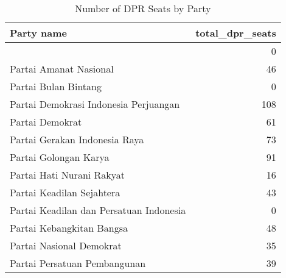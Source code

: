 
\begin{longtable}[t]{lr}
\caption{Number of DPR Seats by Party}\\
\toprule
Party name & total\_dpr\_seats\\
\midrule
 & 0\\
Partai Amanat Nasional & 46\\
Partai Bulan Bintang & 0\\
Partai Demokrasi Indonesia Perjuangan & 108\\
Partai Demokrat & 61\\
\addlinespace
Partai Gerakan Indonesia Raya & 73\\
Partai Golongan Karya & 91\\
Partai Hati Nurani Rakyat & 16\\
Partai Keadilan Sejahtera & 43\\
Partai Keadilan dan Persatuan Indonesia & 0\\
\addlinespace
Partai Kebangkitan Bangsa & 48\\
Partai Nasional Demokrat & 35\\
Partai Persatuan Pembangunan & 39\\
\bottomrule
\end{longtable}

